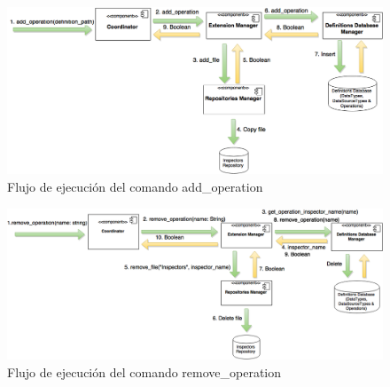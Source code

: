 \begin{figure}[H]
    \begin{center}
        \includegraphics[width=\textwidth]{figures/add_operation}
        \caption{Flujo de ejecución del comando add\_operation}
    \end{center}
\end{figure}

\begin{figure}[H]
    \begin{center}
        \includegraphics[width=\textwidth]{figures/remove_operation}
        \caption{Flujo de ejecución del comando remove\_operation}
    \end{center}
\end{figure}
